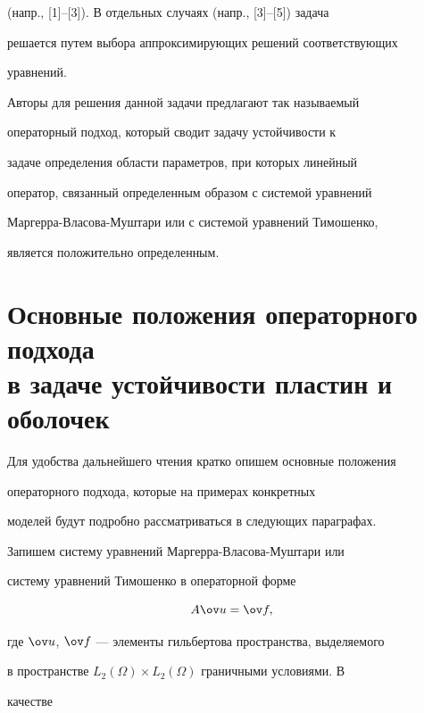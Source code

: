 (напр., [1]--[3]). В отдельных случаях (напр., [3]--[5]) задача 


решается путем выбора аппроксимирующих решений соответствующих 


уравнений. 


 


Авторы для решения данной задачи предлагают так называемый 


операторный подход, который сводит задачу устойчивости к 


задаче определения области параметров, при которых линейный 


оператор, связанный определенным образом с системой уравнений 


Маргерра-Власова-Муштари или с системой уравнений Тимошенко, 


является положительно определенным. 


 


\section{Основные положения операторного подхода\protect\\ 


в задаче устойчивости пластин и оболочек} 


 


Для удобства дальнейшего чтения кратко опишем основные положения 


операторного подхода, которые на примерах конкретных 


моделей будут подробно рассматриваться в следующих параграфах. 


 


Запишем систему уравнений Маргерра-Власова-Муштари или 


систему уравнений Тимошенко в операторной форме 


\begin{equation} 


A\ov u=\ov f, 


\end{equation} 


где $\ov u$, $\ov f$ --- элементы гильбертова пространства, выделяемого 


в пространстве $L_2(\Omega)\times L_2(\Omega)$ граничными условиями. В 


качестве 



